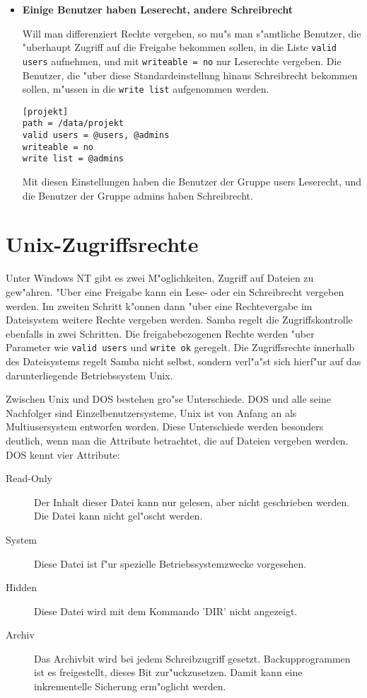 \documentclass{scrartcl}
\newcommand{\param}{\texttt}
\begin{document}
\begin{itemize}
\item {\bf Einige Benutzer haben Leserecht, andere Schreibrecht}

Will man differenziert Rechte vergeben, so mu"s man s"amtliche
Benutzer, die "uberhaupt Zugriff auf die Freigabe bekommen sollen, in
die Liste \param{valid users} aufnehmen, und mit \param{writeable =
no} nur Leserechte vergeben. Die Benutzer, die "uber diese
Standardeinstellung hinaus Schreibrecht bekommen sollen, m"ussen in
die \param{write list} aufgenommen werden.

\begin{verbatim}
[projekt]
path = /data/projekt
valid users = @users, @admins
writeable = no
write list = @admins
\end{verbatim}

Mit diesen Einstellungen haben die Benutzer der Gruppe users
Leserecht, und die Benutzer der Gruppe admins haben Schreibrecht.

\end{itemize}

\section{Unix-Zugriffsrechte}

Unter Windows NT gibt es zwei M"oglichkeiten, Zugriff auf Dateien zu
gew"ahren. "Uber eine Freigabe kann ein Lese- oder ein Schreibrecht
vergeben werden. Im zweiten Schritt k"onnen dann "uber eine
Rechtevergabe im Dateisystem weitere Rechte vergeben werden. Samba
regelt die Zugriffskontrolle ebenfalls in zwei Schritten. Die
freigabebezogenen Rechte werden "uber Parameter wie \param{valid
users} und \param{write ok} geregelt. Die Zugriffsrechte innerhalb des
Dateisystems regelt Samba nicht selbst, sondern verl"a"st sich
hierf"ur auf das darunterliegende Betriebssystem Unix.

Zwischen Unix und DOS bestehen gro"se Unterschiede. DOS und alle seine
Nachfolger sind Einzelbenutzersysteme, Unix ist von Anfang an als
Multiusersystem entworfen worden. Diese Unterschiede werden besonders
deutlich, wenn man die Attribute betrachtet, die auf Dateien vergeben
werden. DOS kennt vier Attribute:

\begin{description}
\item[Read-Only] Der Inhalt dieser Datei kann nur gelesen, aber nicht
geschrieben werden. Die Datei kann nicht gel"oscht werden.
\item[System] Diese Datei ist f"ur spezielle Betriebssystemzwecke
vorgesehen.
\item[Hidden] Diese Datei wird mit dem Kommando 'DIR' nicht angezeigt.
\item[Archiv] Das Archivbit wird bei jedem Schreibzugriff gesetzt.
Backupprogrammen ist es freigestellt, dieses Bit zur"uckzusetzen.
Damit kann eine inkrementelle Sicherung erm"oglicht werden.
\end{description}
\end{document}
